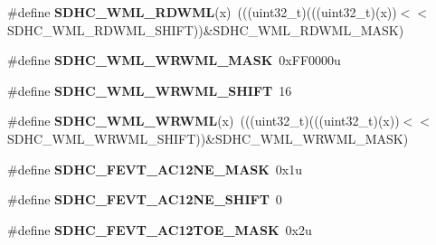 \begin{DoxyCompactItemize}
\item 
\#define {\bfseries S\+D\+H\+C\+\_\+\+W\+M\+L\+\_\+\+R\+D\+W\+ML}(x)~(((uint32\+\_\+t)(((uint32\+\_\+t)(x))$<$$<$S\+D\+H\+C\+\_\+\+W\+M\+L\+\_\+\+R\+D\+W\+M\+L\+\_\+\+S\+H\+I\+FT))\&S\+D\+H\+C\+\_\+\+W\+M\+L\+\_\+\+R\+D\+W\+M\+L\+\_\+\+M\+A\+SK)\hypertarget{group__SDHC__Register__Masks_gad9a5ef012064c89985cefc46d8b98614}{}\label{group__SDHC__Register__Masks_gad9a5ef012064c89985cefc46d8b98614}

\item 
\#define {\bfseries S\+D\+H\+C\+\_\+\+W\+M\+L\+\_\+\+W\+R\+W\+M\+L\+\_\+\+M\+A\+SK}~0x\+F\+F0000u\hypertarget{group__SDHC__Register__Masks_gabfe9926c62d373c8d28b1bcc7ba0010f}{}\label{group__SDHC__Register__Masks_gabfe9926c62d373c8d28b1bcc7ba0010f}

\item 
\#define {\bfseries S\+D\+H\+C\+\_\+\+W\+M\+L\+\_\+\+W\+R\+W\+M\+L\+\_\+\+S\+H\+I\+FT}~16\hypertarget{group__SDHC__Register__Masks_ga026a7e92688832bffea0905554f30253}{}\label{group__SDHC__Register__Masks_ga026a7e92688832bffea0905554f30253}

\item 
\#define {\bfseries S\+D\+H\+C\+\_\+\+W\+M\+L\+\_\+\+W\+R\+W\+ML}(x)~(((uint32\+\_\+t)(((uint32\+\_\+t)(x))$<$$<$S\+D\+H\+C\+\_\+\+W\+M\+L\+\_\+\+W\+R\+W\+M\+L\+\_\+\+S\+H\+I\+FT))\&S\+D\+H\+C\+\_\+\+W\+M\+L\+\_\+\+W\+R\+W\+M\+L\+\_\+\+M\+A\+SK)\hypertarget{group__SDHC__Register__Masks_gaab80c8d04a4c7c27fb4f5b24d1622945}{}\label{group__SDHC__Register__Masks_gaab80c8d04a4c7c27fb4f5b24d1622945}

\item 
\#define {\bfseries S\+D\+H\+C\+\_\+\+F\+E\+V\+T\+\_\+\+A\+C12\+N\+E\+\_\+\+M\+A\+SK}~0x1u\hypertarget{group__SDHC__Register__Masks_ga9f03ca4771ba7ba7dd17652cc0b3523f}{}\label{group__SDHC__Register__Masks_ga9f03ca4771ba7ba7dd17652cc0b3523f}

\item 
\#define {\bfseries S\+D\+H\+C\+\_\+\+F\+E\+V\+T\+\_\+\+A\+C12\+N\+E\+\_\+\+S\+H\+I\+FT}~0\hypertarget{group__SDHC__Register__Masks_gaaa25d15ca9ece7802c84eaabfcb610a3}{}\label{group__SDHC__Register__Masks_gaaa25d15ca9ece7802c84eaabfcb610a3}

\item 
\#define {\bfseries S\+D\+H\+C\+\_\+\+F\+E\+V\+T\+\_\+\+A\+C12\+T\+O\+E\+\_\+\+M\+A\+SK}~0x2u\hypertarget{group__SDHC__Register__Masks_ga08461177de9d00d32471a042648a0d67}{}\label{group__SDHC__Register__Masks_ga08461177de9d00d32471a042648a0d67}


\end{DoxyCompactItemize}
